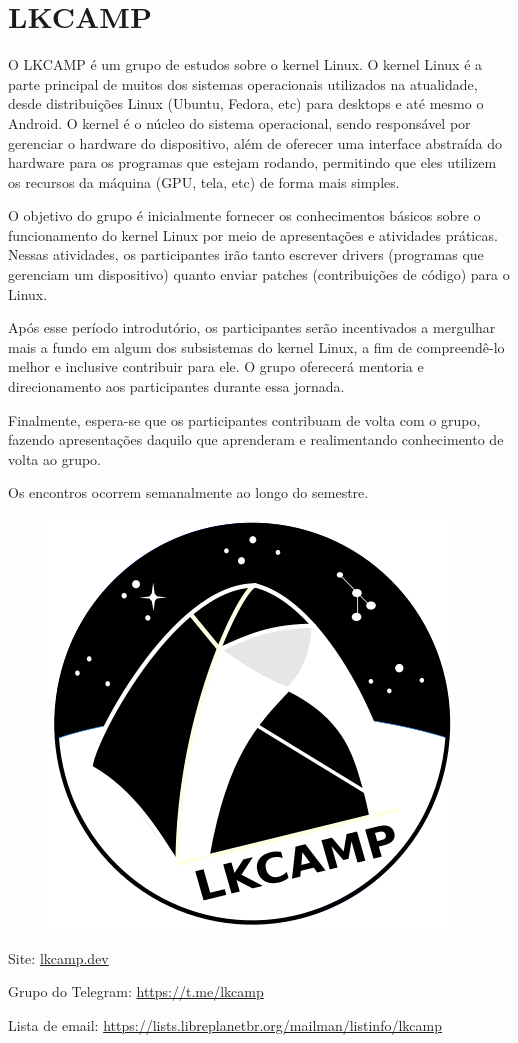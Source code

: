 
\section{LKCAMP}

O LKCAMP é um grupo de estudos sobre o kernel Linux.
O kernel Linux é a parte principal de muitos dos sistemas operacionais
utilizados na atualidade, desde distribuições Linux (Ubuntu, Fedora, etc) para
desktops e até mesmo o Android.
O kernel é o núcleo do sistema operacional, sendo responsável por gerenciar o
hardware do dispositivo, além de oferecer uma interface abstraída do hardware
para os programas que estejam rodando, permitindo que eles utilizem os recursos
da máquina (GPU, tela, etc) de forma mais simples.

O objetivo do grupo é inicialmente fornecer os conhecimentos básicos sobre o
funcionamento do kernel Linux por meio de apresentações e atividades práticas.
Nessas atividades, os participantes irão tanto escrever drivers (programas que
gerenciam um dispositivo) quanto enviar patches (contribuições de código) para o
Linux.

Após esse período introdutório, os participantes serão incentivados a mergulhar
mais a fundo em algum dos subsistemas do kernel Linux, a fim de compreendê-lo
melhor e inclusive contribuir para ele.
O grupo oferecerá mentoria e direcionamento aos participantes durante essa
jornada.

Finalmente, espera-se que os participantes contribuam de volta com o grupo,
fazendo apresentações daquilo que aprenderam e realimentando conhecimento de
volta ao grupo.

Os encontros ocorrem semanalmente ao longo do semestre.

\begin{figure}[H]
  \centering
  \includegraphics[width=.24\textwidth]
  {img/alem_da_graduacao/lkcamp_logo.png}
\end{figure}


\begin{compactitemize}
\item Site: \url{lkcamp.dev}
\item Grupo do Telegram: \url{https://t.me/lkcamp}
\item Lista de email: \url{https://lists.libreplanetbr.org/mailman/listinfo/lkcamp}
\end{compactitemize}
